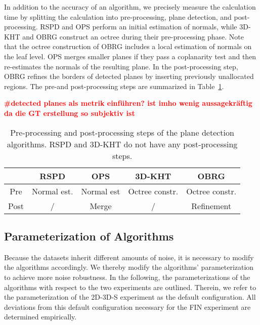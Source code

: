 \documentclass[main.tex]{subfiles}
\begin{document}
In addition to the accuracy of an algorithm, we precisely measure the calculation time by splitting the calculation into pre-processing, plane
detection, and post-processing.
RSPD and OPS perform an initial estimation of normals, while 3D-KHT and OBRG construct an octree during their
pre-processing phase. Note that the octree construction of OBRG includes a local estimation of normals on the
leaf level. OPS merges smaller planes if they pass a coplanarity test and then re-estimates the normals of the
resulting plane. In the post-processing step, OBRG refines the borders of detected planes by inserting
previously unallocated regions.
The pre-and post-processing steps are summarized in Table~\ref{tab:pre-post}.

\textbf{\textcolor{red}{\#detected planes als metrik einführen? ist imho wenig aussagekräftig da die GT erstellung so subjektiv ist}}

\begin{table}[H]
    \centering
    \begin{tabular}{c|cccc}
             & RSPD        & OPS        & 3D-KHT         & OBRG           \\ \hline
        Pre  & Normal est. & Normal est & Octree constr. & Octree constr. \\
        Post & /           & Merge      & /              & Refinement
    \end{tabular}
    \caption{Pre-processing and post-processing steps of the plane detection algorithms. RSPD and 3D-KHT do not have any post-processing steps.}
    \label{tab:pre-post}
\end{table}


\subsection{Parameterization of Algorithms}
Because the datasets inherit different amounts of noise, it is necessary to modify the algorithms accordingly.
We thereby modify the algorithms' parameterization to achieve more noise robustness.
In the following, the parameterizations of the algorithms with respect to the two experiments are outlined.
Therein, we refer to the parameterization of the 2D-3D-S experiment as the default configuration.
All deviations from this default configuration necessary for the FIN experiment are determined empirically.
\end{document}
